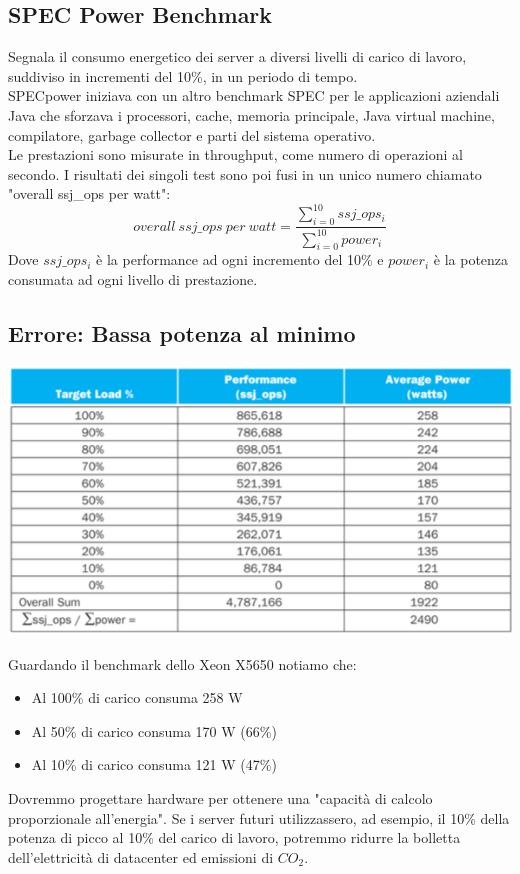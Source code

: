 \documentclass[12pt,a4paper]{article}
\begin{document}
\subsection{SPEC Power Benchmark}
Segnala il consumo energetico dei server a diversi livelli di carico di lavoro, suddiviso in incrementi del 10\%, in un periodo di tempo.\\
SPECpower iniziava con un altro benchmark SPEC per le applicazioni aziendali Java che sforzava i processori, cache, memoria principale, Java virtual machine, compilatore, garbage collector e parti del sistema operativo.\\
Le prestazioni sono misurate in throughput, come numero di operazioni al secondo. I risultati dei singoli test sono poi fusi in un unico numero chiamato "overall ssj\_ops per watt":
\begin{displaymath}
	overall\ ssj\_ops\ per\ watt = \frac{\displaystyle\sum_{i=0}^{10}ssj\_ops_i}{\displaystyle\sum_{i=0}^{10} power_i}
\end{displaymath}
Dove $ssj\_ops_i$ è la performance ad ogni incremento del 10\% e $power_i$ è la potenza consumata ad ogni livello di prestazione.

\subsection{Errore: Bassa potenza al minimo}
\begin{center}
\includegraphics[width=0.9\columnwidth]{img/xeon.png}
\end{center}
Guardando il benchmark dello Xeon X5650 notiamo che:
\begin{itemize}
\item Al 100\% di carico consuma 258 W
\item Al 50\% di carico consuma 170 W (66\%)
\item Al 10\% di carico consuma 121 W (47\%)
\end{itemize}
Dovremmo progettare hardware per ottenere una "capacità di calcolo proporzionale all'energia". Se i server futuri utilizzassero, ad esempio, il 10\% della potenza di picco al 10\% del carico di lavoro, potremmo ridurre la bolletta dell'elettricità di datacenter ed emissioni di $CO_2$.
\end{document}
